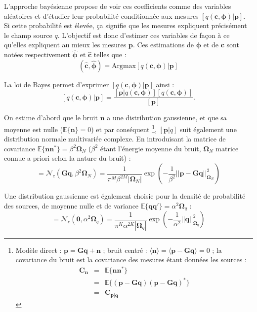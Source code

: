 L'approche bayésienne propose de voir ces coefficients comme des variables aléatoires et d'étudier leur probabilité conditionnée aux mesures $[q(\bm{c},\bm{\phi})|\bm{p}]$. Si cette probabilité est élevée, ça signifie que les mesures expliquent précisément le champ source $q$. L'objectif est donc d'estimer ces variables de façon à ce qu'elles expliquent au mieux les mesures $\bm{p}$. Ces estimations de $\bm{\phi}$ et de $\bm{c}$ sont notées respectivement $\bm{\hat{\phi}}$ et $\bm{\hat{c}}$ telles que : 
\begin{equation}
	(\bm{\hat{c}},\bm{\hat{\phi}}) = \text{Argmax}[q(\bm{c},\bm{\phi})|\bm{p}]
\end{equation}

La loi de Bayes permet d'exprimer $[q(\bm{c},\bm{\phi})|\bm{p}]$ ainsi : 
\begin{equation}
\label{bayes}
[q(\bm{c},\bm{\phi})|\bm{p}]=\frac{[\bm{p}|q(\bm{c},\bm{\phi})][q(\bm{c},\bm{\phi})]}{[\bm{p}]}.
\end{equation}



On estime d'abord que le bruit $\bm{n}$  a une distribution gaussienne, et que sa moyenne est nulle ($\mathbb{E}\{\bm{n}\}=0$) et par conséquent 
\footnote{Modèle direct : $\bm{p}=\bm{Gq}+\bm{n}$ ; bruit centré : $\langle \bm{n}\rangle = \langle \bm{p}-\bm{Gq} \rangle = 0 $ ; la covariance du bruit est la covariance des mesures étant données les sources : 
\begin{eqnarray*}
\bm{C_n}& = & \mathbb{E}\{\bm{n}\bm{n}^*\} \\
		& = & \mathbb{E}\{(\bm{p}-\bm{Gq})(\bm{p}-\bm{Gq})^*\}  \\
		& = & \bm{C_{\bm{p}|\bm{q}}} 
\end{eqnarray*}
},
$[\bm{p}|q]$ suit également une distribution normale multivariée complexe. En introduisant la matrice de covariance $\mathbb{E}\{\bm{n}\bm{n}^*\}=\beta^{2}\bm{\Omega}_N$ ($\beta^2$ étant l'énergie moyenne du bruit, $\bm{\Omega}_N$ matrice connue a priori selon la nature du bruit) : 
\begin{equation}
[\bm{p}|q,\beta^2] =\mathcal{N}_c(\bm{G}\bm{q},\beta^2\bm{\Omega}_N) = \frac{   1   }{ \pi^M \beta^{2M} |\bm{\Omega}_N| } \exp \left( -\frac{1}{\beta^2} ||   \bm{p}  -  \bm{Gq}  ||^2_{\bm{\Omega}_N} \right)
\end{equation}

Une distribution gaussienne est également choisie pour la densité de probabilité des sources, de moyenne nulle et de variance $\mathbb{E}\{\bm{q}\bm{q}'\}=\alpha^2 \bm{\Omega}_q$ : 
\begin{equation}
	[\bm{q}|\alpha^2] = \mathcal{N}_c(\bm{0}, \alpha^2\bm{\Omega}_q) = \frac{  1  }{  \pi^K\alpha^{2K} |\bm{\Omega}_q|} \exp \left( -\frac{1}{\alpha^2}   ||\bm{q}||^2_{\bm{\Omega}_q} \right)
\end{equation}

